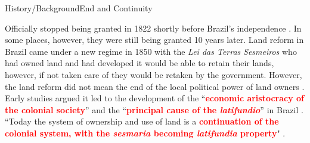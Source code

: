 \documentclass[aspectratio=1610]{beamer}
\begin{document}
\begin{frame}{History/Background}{End and Continuity}
    \begin{outline}
        \1 Officially stopped being granted in 1822 shortly before Brazil's independence \parencite{Silva2019-vj}. 
            \2 In some places, however, they were still being granted 10 years later.
        \pause 
        \vspace{2mm}
        \1 Land reform in Brazil came under a new regime in 1850 with the \textit{Lei das Terras} \parencite[p.~148]{Da_Costa_Porto1979-dz}
        \vspace{1mm}
            \2 \textit{Sesmeiros} who had owned land and had developed it would be able to retain their lands, however, if not taken care of they would be retaken by the government.
        \vspace{1mm}
            \2 However, the land reform did not mean the end of the local political power of land owners \parencite{Motta1998-xw}.
        \pause 
        \1 Early studies argued it led to the development of the ``\textcolor{red}{\textbf{economic aristocracy of the colonial society}}'' and the ``\textcolor{red}{\textbf{principal cause of the \textit{latifundio}}}'' in Brazil \parencites[p.~36]{Lima2002-kd}[p.~48]{Da_Costa_Porto1979-dz}.
        \vspace{1mm}
        \1 ``Today the system of ownership and use of land is a \textcolor{red}{\textbf{continuation of the colonial system, with the \textit{sesmaria} becoming \textit{latifundia} property}}" \parencite[p.~18]{Andrade1980-md}.
    \end{outline}    
\end{frame}
\end{document}

